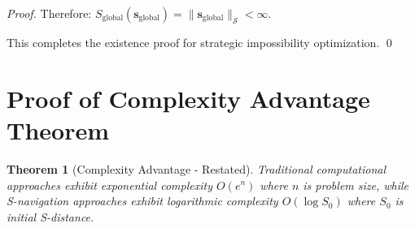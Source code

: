 \documentclass[12pt,a4paper]{article}
\newtheorem{theorem}{Theorem}
\begin{document}
\begin{proof}
Therefore: $S_{\text{global}}(\mathbf{s}_{\text{global}}) = \|\mathbf{s}_{\text{global}}\|_{\mathcal{S}} < \infty$.

This completes the existence proof for strategic impossibility optimization. \qed
\end{proof}

\section{Proof of Complexity Advantage Theorem}
\label{proof:complexity_advantage}

\begin{theorem}[Complexity Advantage - Restated]
Traditional computational approaches exhibit exponential complexity $O(e^n)$ where $n$ is problem size, while S-navigation approaches exhibit logarithmic complexity $O(\log S_0)$ where $S_0$ is initial S-distance.
\end{theorem}
\end{document}
